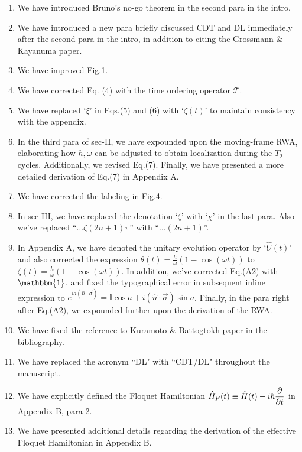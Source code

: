 \documentclass[aps,prb,reprint,showpacs,floatfix,superscriptaddress, onecolumn, nofootinbib, 9pt]{revtex4-2}
\begin{document}
\begin{enumerate}
    \item We have introduced Bruno's no-go theorem in the second para in the intro.
    \item We have introduced a new para  briefly discussed CDT and DL immediately after the second para in the intro, in addition to citing the Grossmann \& Kayanuma paper. 
    \item We have improved Fig.1.
    \item We have corrected Eq. (4) with the time ordering operator $\mathcal{T}$.
    \item We have replaced `$\xi$' in Eqs.(5) and (6) with `$\zeta(t)$' to maintain consistency with the  appendix.
    \item In the third para of sec-II, we have expounded upon the moving-frame RWA, elaborating how $h,\omega$ can be adjusted to obtain  localization during the $T_2-$cycles. Additionally, we revised Eq.(7). Finally, we have presented a more detailed derivation of Eq.(7) in Appendix A.
    \item We have corrected the labeling in Fig.4.
    \item In sec-III, we have replaced the denotation `$\zeta$' with `$\chi$'  in the last para. Also we've replaced ``$\dots\zeta(2n+1)\pi$'' with ``$\dots (2n+1)$''.
    \item In Appendix A, we have denoted the unitary evolution operator by `$\hat{U}(t)$' and also corrected the expression $\theta(t) = \frac{h}{\omega}(1-\cos(\omega t))$ to $\zeta(t) = \frac{h}{\omega}(1-\cos(\omega t))$. In addition, we've corrected Eq.(A2) with $\mathbbm{1}$, and fixed the typographical error in subsequent inline expression to 
    $e^{i a\left(\hat{n} \cdot \vec{\sigma}\right)} = \mathbb{I}\cos{a} + i (\hat{n} \cdot \vec{\sigma}) \sin{a}$. Finally, in the para right after Eq.(A2), we expounded further upon the derivation of the RWA.
    
    \item We have fixed the reference to Kuramoto \& Battogtokh paper in the bibliography.
    \item We have replaced the acronym ``DL" with ``CDT/DL" throughout the manuscript.
    
    \item We have explicitly defined the Floquet Hamiltonian $\displaystyle \hat{H}_F(t) \equiv \hat{H}(t) - i\hbar \pdv{t}$ in Appendix B, para 2.
    
    \item We have presented additional details regarding the derivation of the effective Floquet Hamiltonian in Appendix B.
\end{enumerate}


\end{document}
